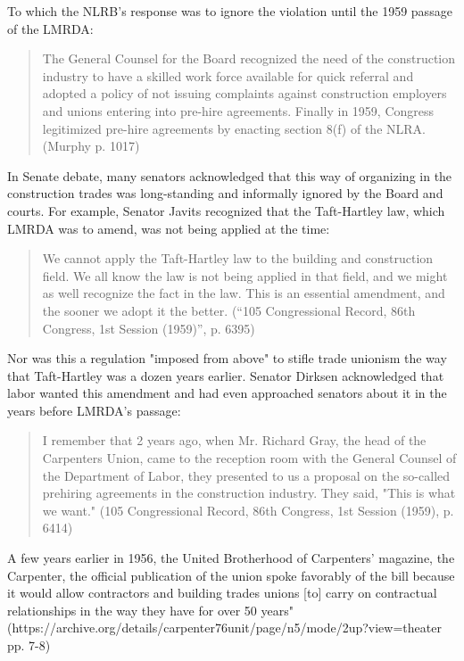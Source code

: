To which the NLRB’s response was to ignore the violation until the 1959 passage of the LMRDA:

\begin{quote}
	The General Counsel for the Board recognized the need of the construction industry to have a skilled work force available for quick referral and adopted a policy of not issuing complaints against construction employers and unions entering into pre-hire agreements. Finally in 1959, Congress legitimized pre-hire agreements by enacting section 8(f) of the NLRA. (Murphy p. 1017)
\end{quote}

In Senate debate, many senators acknowledged that this way of organizing in the construction trades was long-standing and informally ignored by the Board and courts. For example, Senator Javits recognized that the Taft-Hartley law, which LMRDA was to amend, was not being applied at the time:

\begin{quote}
	We cannot apply the Taft-Hartley law to the building and construction field. We all know the law is not being applied in that field, and we might as well recognize the fact in the law. This is an essential amendment, and the sooner we adopt it the better. (“105 Congressional Record, 86th Congress, 1st Session (1959)”, p. 6395) 
\end{quote}

Nor was this a regulation "imposed from above" to stifle trade unionism the way that Taft-Hartley was a dozen years earlier. Senator Dirksen acknowledged that labor wanted this amendment and had even approached senators about it in the years before LMRDA’s passage:

\begin{quote}
I remember that 2 years ago, when Mr. Richard Gray, the head of the Carpenters Union, came to the reception room with the General Counsel of the Department of Labor, they presented to us a proposal on the so-called prehiring agreements in the construction industry. They said, "This is what we want." (105 Congressional Record, 86th Congress, 1st Session (1959), p. 6414)
\end{quote}

A few years earlier in 1956, the United Brotherhood of Carpenters’ magazine, the Carpenter, the official publication of the union spoke favorably of the bill because it would allow contractors and building trades unions [to] carry on contractual relationships in the way they have for over 50 years" (https://archive.org/details/carpenter76unit/page/n5/mode/2up?view=theater pp. 7-8)

